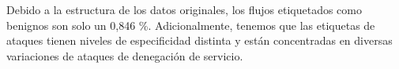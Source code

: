 \documentclass[10pt,a4paper,twoside]{article}
\begin{document}
\begin{multicols*}{2}
    \begin{table}[H]
        \begin{center}
        \end{center}
        \caption{Tiempos de análisis}
        \label{table:statstimeoffline}
    \end{table}

    \begin{table}[H]
        \begin{center}
        \end{center}
        \caption{Archivos generados durante el análisis}
        \label{table:generatedfilesoffline}
    \end{table}

    Debido a la estructura de los datos originales, los flujos etiquetados como benignos son solo un 0,846 \%. Adicionalmente, tenemos que las etiquetas de ataques tienen niveles de especificidad distinta y están concentradas en diversas variaciones de ataques de denegación de servicio.


\end{multicols*}
\end{document}
